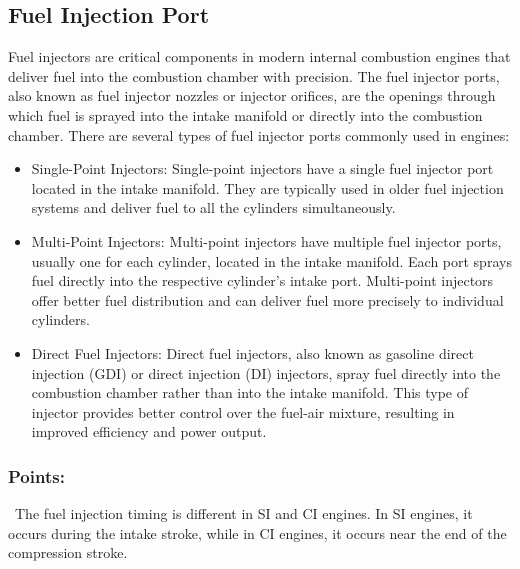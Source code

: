 \documentclass{article}
\begin{document}
\subsection*{Fuel Injection Port}
Fuel injectors are critical components in modern internal combustion engines that deliver fuel into the combustion chamber with precision. The fuel injector ports, also known as fuel injector nozzles or injector orifices, are the openings through which fuel is sprayed into the intake manifold or directly into the combustion chamber. There are several types of fuel injector ports commonly used in engines:
\begin{itemize}
	\item Single-Point Injectors: Single-point injectors have a single fuel injector port located in the intake manifold. They are typically used in older fuel injection systems and deliver fuel to all the cylinders simultaneously.
	\item Multi-Point Injectors: Multi-point injectors have multiple fuel injector ports, usually one for each cylinder, located in the intake manifold. Each port sprays fuel directly into the respective cylinder's intake port. Multi-point injectors offer better fuel distribution and can deliver fuel more precisely to individual cylinders.
	\item Direct Fuel Injectors: Direct fuel injectors, also known as gasoline direct injection (GDI) or direct injection (DI) injectors, spray fuel directly into the combustion chamber rather than into the intake manifold. This type of injector provides better control over the fuel-air mixture, resulting in improved efficiency and power output.
\end{itemize}

\subsubsection*{Points:}
\checkmark \, The fuel injection timing is different in SI and CI engines. In SI engines, it occurs during the intake stroke, while in CI engines, it occurs near the end of the compression stroke.\\
\end{document}

